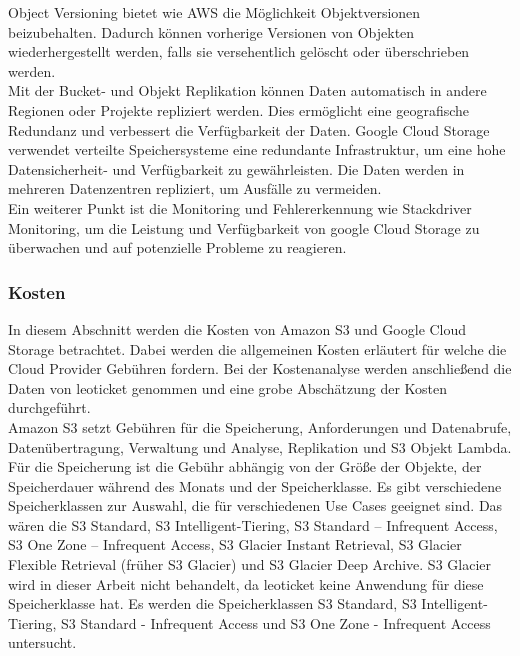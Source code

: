 Object Versioning bietet wie AWS die Möglichkeit Objektversionen beizubehalten. Dadurch können vorherige Versionen von Objekten wiederhergestellt werden, falls sie versehentlich gelöscht oder überschrieben werden.\\

Mit der Bucket- und Objekt Replikation können Daten automatisch in andere Regionen oder Projekte repliziert werden. Dies ermöglicht eine geografische Redundanz und verbessert die Verfügbarkeit der Daten. Google Cloud Storage verwendet verteilte Speichersysteme eine redundante Infrastruktur, um eine hohe Datensicherheit- und Verfügbarkeit zu gewährleisten. Die Daten werden in mehreren Datenzentren repliziert, um Ausfälle zu vermeiden.\\

Ein weiterer Punkt ist die Monitoring und Fehlererkennung wie Stackdriver Monitoring, um die Leistung und Verfügbarkeit von google Cloud Storage zu überwachen und auf potenzielle Probleme zu reagieren.

\newpage

\subsubsection{Kosten}

In diesem Abschnitt werden die Kosten von Amazon S3 und Google Cloud Storage betrachtet. Dabei werden die allgemeinen Kosten erläutert für welche die Cloud Provider Gebühren fordern. Bei der Kostenanalyse werden anschließend die Daten von leoticket genommen und eine grobe Abschätzung der Kosten durchgeführt.\\

Amazon S3 setzt Gebühren für die Speicherung, Anforderungen und Datenabrufe, Datenübertragung, Verwaltung und Analyse, Replikation und S3 Objekt Lambda. Für die Speicherung ist die Gebühr abhängig von der Größe der Objekte, der Speicherdauer während des Monats und der Speicherklasse. Es gibt verschiedene Speicherklassen zur Auswahl, die für verschiedenen Use Cases geeignet sind. Das wären die S3 Standard, S3 Intelligent-Tiering, S3 Standard – Infrequent Access, S3 One Zone – Infrequent Access, S3 Glacier Instant Retrieval, S3 Glacier Flexible Retrieval (früher S3 Glacier) und S3 Glacier Deep Archive. S3 Glacier wird in dieser Arbeit nicht behandelt, da leoticket keine Anwendung für diese Speicherklasse hat. Es werden die Speicherklassen S3 Standard, S3 Intelligent-Tiering, S3 Standard - Infrequent Access und S3 One Zone - Infrequent Access untersucht.

